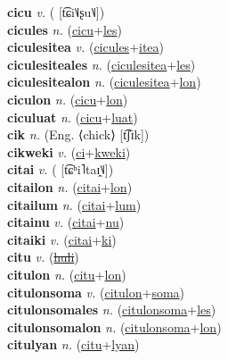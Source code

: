 \textbf{cicu} \textit{v.} ( [t͡ɕi˥˩ʂu˥˩])
 \label{cicu} \\
\textbf{cicules} \textit{n.} (\hyperref[cicu]{cicu}+\hyperref[les]{les})
 \label{cicules} \\
\textbf{ciculesitea} \textit{v.} (\hyperref[cicules]{cicules}+\hyperref[itea]{itea})
 \label{ciculesitea} \\
\textbf{ciculesiteales} \textit{n.} (\hyperref[ciculesitea]{ciculesitea}+\hyperref[les]{les})
 \label{ciculesiteales} \\
\textbf{ciculesitealon} \textit{n.} (\hyperref[ciculesitea]{ciculesitea}+\hyperref[lon]{lon})
 \label{ciculesitealon} \\
\textbf{ciculon} \textit{n.} (\hyperref[cicu]{cicu}+\hyperref[lon]{lon})
 \label{ciculon} \\
\textbf{ciculuat} \textit{n.} (\hyperref[cicu]{cicu}+\hyperref[luat]{luat})
 \label{ciculuat} \\
\textbf{cik} \textit{n.} (Eng. ⟨chick⟩ [t͡ʃɪk])
 \label{cik} \\
\textbf{cikweki} \textit{v.} (\hyperref[ci]{ci}+\hyperref[kweki]{kweki})
 \label{cikweki} \\
\textbf{citai} \textit{v.} ( [t͡ɕʰi˥taɪ̯˥˩])
 \label{citai} \\
\textbf{citailon} \textit{n.} (\hyperref[citai]{citai}+\hyperref[lon]{lon})
 \label{citailon} \\
\textbf{citailum} \textit{n.} (\hyperref[citai]{citai}+\hyperref[lum]{lum})
 \label{citailum} \\
\textbf{citainu} \textit{v.} (\hyperref[citai]{citai}+\hyperref[nu]{nu})
 \label{citainu} \\
\textbf{citaiki} \textit{v.} (\hyperref[citai]{citai}+\hyperref[ki]{ki})
 \label{citaiki} \\
\textbf{citu} \textit{v.} (\hyperref[huli]{\sout{huli}})
 \label{citu} \\
\textbf{citulon} \textit{n.} (\hyperref[citu]{citu}+\hyperref[lon]{lon})
 \label{citulon} \\
\textbf{citulonsoma} \textit{v.} (\hyperref[citulon]{citulon}+\hyperref[soma]{soma})
 \label{citulonsoma} \\
\textbf{citulonsomales} \textit{n.} (\hyperref[citulonsoma]{citulonsoma}+\hyperref[les]{les})
 \label{citulonsomales} \\
\textbf{citulonsomalon} \textit{n.} (\hyperref[citulonsoma]{citulonsoma}+\hyperref[lon]{lon})
 \label{citulonsomalon} \\
\textbf{citulyan} \textit{n.} (\hyperref[citu]{citu}+\hyperref[lyan]{lyan})

